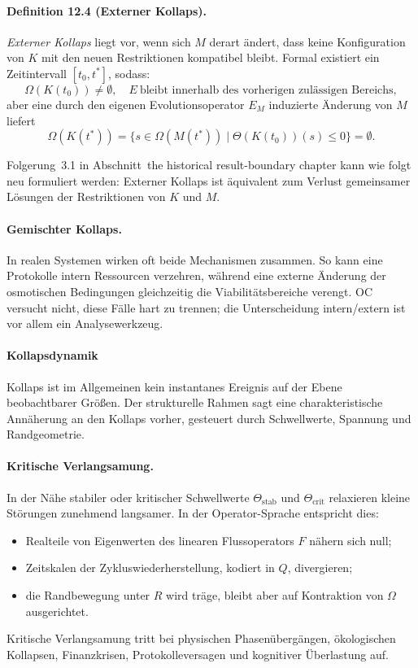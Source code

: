 \paragraph{Definition 12.4 (Externer Kollaps).}
\emph{Externer Kollaps} liegt vor, wenn sich \(M\) derart ändert, dass keine
Konfiguration von \(K\) mit den neuen Restriktionen kompatibel bleibt.
Formal existiert ein Zeitintervall \([t_0,t^{\ast}]\), sodass:
\[
  \Omega(K(t_0))\neq\emptyset,
  \quad
  E\ \text{bleibt innerhalb des vorherigen zulässigen Bereichs},
\]
aber eine durch den eigenen Evolutionsoperator \(E_M\) induzierte Änderung von
\(M\) liefert
\[
  \Omega(K(t^{\ast})) =
    \big\{ s \in \Omega(M(t^{\ast})) \mid
           \Theta(K(t_0))(s)\le 0 \big\} = \emptyset.
\]

Folgerung~3.1 in Abschnitt~the historical result-boundary chapter kann wie folgt neu formuliert
werden: Externer Kollaps ist äquivalent zum Verlust gemeinsamer Lösungen der
Restriktionen von \(K\) und \(M\).

\paragraph{Gemischter Kollaps.}
In realen Systemen wirken oft beide Mechanismen zusammen. So kann eine
Protokolle intern Ressourcen verzehren, während eine externe Änderung der
osmotischen Bedingungen gleichzeitig die Viabilitätsbereiche verengt.
OC versucht nicht, diese Fälle hart zu trennen; die Unterscheidung intern/extern
ist vor allem ein Analysewerkzeug.

\paragraph{Kollapsdynamik}

Kollaps ist im Allgemeinen kein instantanes Ereignis auf der Ebene beobachtbarer
Größen. Der strukturelle Rahmen sagt eine charakteristische Annäherung an den
Kollaps vorher, gesteuert durch Schwellwerte, Spannung und Randgeometrie.

\paragraph{Kritische Verlangsamung.}
In der Nähe stabiler oder kritischer Schwellwerte \(\Theta_{\mathrm{stab}}\) und
\(\Theta_{\mathrm{crit}}\) relaxieren kleine Störungen zunehmend langsamer.
In der Operator-Sprache entspricht dies:
\begin{itemize}
  \item Realteile von Eigenwerten des linearen Flussoperators \(F\) nähern sich
        null;
  \item Zeitskalen der Zykluswiederherstellung, kodiert in \(Q\), divergieren;
  \item die Randbewegung unter \(R\) wird träge, bleibt aber auf Kontraktion von
        \(\Omega\) ausgerichtet.
\end{itemize}
Kritische Verlangsamung tritt bei physischen Phasenübergängen, ökologischen
Kollapsen, Finanzkrisen, Protokolleversagen und kognitiver Überlastung auf.

